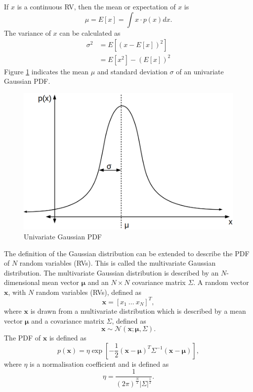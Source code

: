 \documentclass[12pt,oneside,openany,a4paper, %
afrikaans,english,
]{memoir}
\numberwithin{equation}{chapter}
\begin{document}
If $x$ is a continuous RV, then the mean or expectation of $x$ is
\begin{equation}
\mu = E\left[ x \right] = \int x \cdot p(x)dx.
\end{equation}
The variance of $x$ can be calculated as
\begin{equation}
\begin{split}
\sigma^2 & = E\left[\left(x - E[x]\right)^2\right]\\
& = E[x^2] - (E[x])^2
\end{split}
\end{equation}
 Figure \ref{fig:gPDF1} indicates the mean $\mu$ and standard deviation $\sigma$ of an univariate Gaussian PDF.
\begin{figure}[H]
  \includegraphics[width=0.6\linewidth]{Figures/univariate.png}
  \centering
  \caption{Univariate Gaussian PDF}
  \label{fig:gPDF1}
\end{figure}
The definition of the Gaussian distribution can be extended to describe the PDF of $N$ random variables (RVs). This is called the multivariate Gaussian distribution. The multivariate Gaussian distribution is described by an $N$-dimensional mean vector $\bm{\mu}$ and an $N\times N$ covariance matrix $\Sigma$. A random vector $\bm{x}$, with $N$ random variables (RVs), defined as
\begin{equation}
\bm{x} = [x_1\ ...\ x_N]^T,
\end{equation}
where $\bm{x}$ is drawn from a multivariate distribution which is described by a mean vector $\bm{\mu}$ and a covariance matrix $\Sigma$, defined as
\begin{equation}
\bm{x} \sim \mathcal{N}(\bm{x}; \bm{\mu},\Sigma).
\end{equation}
The PDF of $\bm{x}$ is defined as
\begin{equation}\label{eq:3}
p(\bm{x})  = \eta\exp\left[-\frac{1}{2}(\bm{x}-\bm{\mu})^T\Sigma^{-1}(\bm{x}-\bm{\mu})\right],
\end{equation}
where $\eta$ is a normalisation coefficient and is defined as
\begin{equation}\label{eq:4}
\eta = \frac{1}{(2\pi)^{\frac{N}{2}}|\Sigma|^{\frac{1}{2}}}.
\end{equation}
\end{document}
